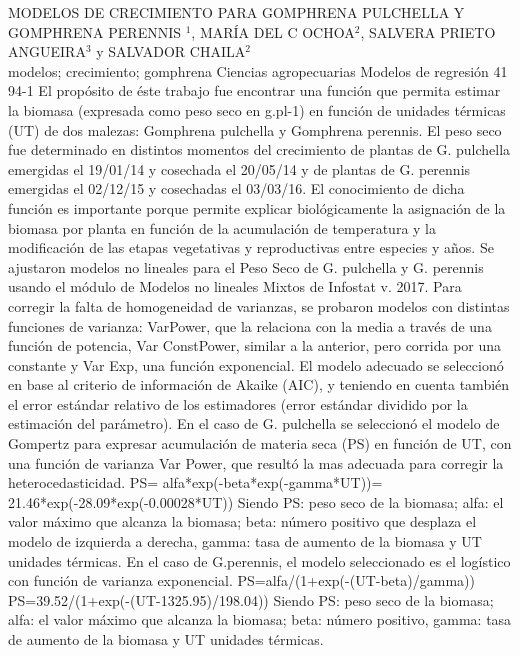 \A
{MODELOS DE CRECIMIENTO PARA GOMPHRENA PULCHELLA Y GOMPHRENA PERENNIS}
{$^1$, MARÍA DEL C OCHOA$^2$, SALVERA PRIETO ANGUEIRA$^3$ y SALVADOR CHAILA$^2$}
{
\\}
{modelos; crecimiento; gomphrena} 
 {Ciencias agropecuarias} 
 {Modelos de regresión} 
 {41} 
 {94-1}
{El propósito de éste trabajo fue encontrar una función que permita estimar la biomasa (expresada como peso seco en g.pl-1) en función de unidades térmicas (UT) de dos malezas: Gomphrena pulchella y Gomphrena perennis. El peso seco fue determinado en distintos momentos del crecimiento de plantas de G. pulchella emergidas el 19/01/14 y cosechada el 20/05/14 y de plantas de G. perennis emergidas el 02/12/15 y cosechadas el 03/03/16. El conocimiento de dicha función es importante porque permite explicar biológicamente la asignación de la biomasa por planta en función de la acumulación de temperatura y la modificación de las etapas vegetativas y reproductivas entre especies y años. Se ajustaron modelos no lineales para el Peso Seco de G. pulchella y G. perennis usando el módulo de Modelos no lineales Mixtos de Infostat v. 2017. Para corregir la falta de homogeneidad de varianzas, se probaron modelos con distintas funciones de varianza: VarPower, que la relaciona con la media a través de una función de potencia, Var ConstPower, similar a la anterior, pero corrida por una constante y Var Exp, una función exponencial. El modelo adecuado se seleccionó en base al criterio de información de Akaike (AIC), y teniendo en cuenta también el error estándar relativo de los estimadores (error estándar dividido por la estimación del parámetro). En el caso de G. pulchella se seleccionó el modelo de Gompertz para expresar acumulación de materia seca (PS) en función de UT, con una función de varianza Var Power, que resultó la mas adecuada para corregir la heterocedasticidad. PS= alfa*exp(-beta*exp(-gamma*UT))= 21.46*exp(-28.09*exp(-0.00028*UT)) Siendo PS: peso seco de la biomasa; alfa: el valor máximo que alcanza la biomasa; beta: número positivo que desplaza el modelo de izquierda a derecha, gamma: tasa de aumento de la biomasa y UT unidades térmicas. En el caso de G.perennis, el modelo seleccionado es el logístico con función de varianza exponencial. PS=alfa/(1+exp(-(UT-beta)/gamma)) PS=39.52/(1+exp(-(UT-1325.95)/198.04)) Siendo PS: peso seco de la biomasa; alfa: el valor máximo que alcanza la biomasa; beta: número positivo, gamma: tasa de aumento de la biomasa y UT unidades térmicas. }
